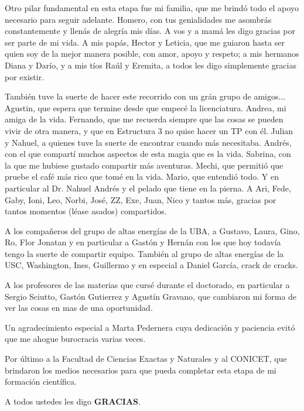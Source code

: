 Otro pilar fundamental en esta etapa fue mi familia, que me brind\'o todo el apoyo necesario para seguir adelante.
Homero, con tus genialidades me asombr\'as constantemente y llen\'as de alegr\'ia mis d\'ias. A vos y a mam\'a les digo gracias por ser parte de mi vida.
A mis pap\'as, Hector y Leticia, que me guiaron hasta ser quien soy de la mejor manera posible, con amor, apoyo y respeto; a mis hermanos Diana y Dar\'io, y a mis t\'ios Ra\'ul y Eremita, a todos les digo simplemente gracias por existir.

Tambi\'en tuve la suerte de hacer este recorrido con un gr\'an grupo de amigos...
Agustin, que espera que termine desde que empec\'e la licenciatura.
Andrea, mi amiga de la vida.
Fernando, que me recuerda siempre que las cosas se pueden vivir de otra manera, y que en Estructura 3 no quise hacer un TP con \'el.
Julian y Nahuel, a quienes tuve la suerte de encontrar cuando m\'as necesitaba.
Andr\'es, con el que compart\'i muchos aspectos de esta magia que es la vida.
Sabrina, con la que me hubiese gustado compartir m\'as aventuras.
Mechi, que permiti\'o que pruebe el caf\'e m\'as rico que tom\'e en la vida.
Mario, que entendi\'o todo.
Y en particular al Dr. Nahuel Andr\'es y el pelado que tiene en la pierna.
A Ari, Fede, Gaby, Ioni, Leo, Norbi, Jos\'e, ZZ, Exe, Juan, Nico y tantos m\'as, gracias por tantos momentos (l\'ease asados) compartidos.

A los compa\~neros del grupo de altas energ\'ias de la UBA, a Gustavo, Laura, Gino, Ro, Flor Jonatan y en particular a Gast\'on y Hern\'an con los que hoy todav\'ia tengo la suerte de compartir equipo.
Tambi\'en al grupo de altas energ\'ias de la USC, Washington, Ines, Guillermo y en especial a Daniel Garc\'ia, crack de cracks.  

A los profesores de las materias que curs\'e durante el doctorado, en particular a Sergio Sciutto, Gast\'on Gutierrez y Agust\'in Gravano, que cambiaron mi forma de ver las cosas en mas de una oportunidad.

Un agradecimiento especial a Marta Pedernera cuya dedicaci\'on y paciencia evit\'o que me ahogue burocracia varias veces.

Por \'ultimo a la Facultad de Ciencias Exactas y Naturales y al CONICET, que brindaron los medios necesarios para que pueda completar esta etapa de mi formaci\'on cient\'ifica.

\vspace{1cm}
A todos ustedes les digo \textbf{GRACIAS}.